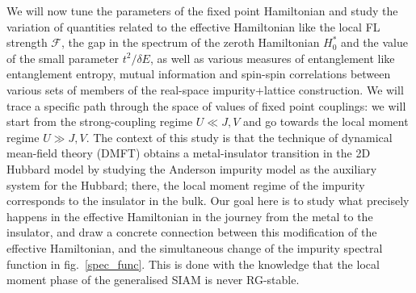 \documentclass{report}
\numberwithin{equation}{section}
\begin{document}
We will now tune the parameters of the fixed point Hamiltonian and study the variation of quantities related to the effective Hamiltonian like the local FL strength \(\mathcal{F}\), the gap in the spectrum of the zeroth Hamiltonian \(H_0^*\) and the value of the small parameter \(t^2/\delta E\), as well as various measures of entanglement like entanglement entropy, mutual information and spin-spin correlations between various sets of members of the real-space impurity+lattice construction. We will trace a specific path through the space of values of fixed point couplings: we will start from the strong-coupling regime \(U \ll J,V\) and go towards the local moment regime \(U \gg J,V\). The context of this study is that the technique of dynamical mean-field theory (DMFT) obtains a metal-insulator transition in the 2D Hubbard model by studying the Anderson impurity model as the auxiliary system for the Hubbard; there, the local moment regime of the impurity corresponds to the insulator in the bulk. Our goal here is to study what precisely happens in the effective Hamiltonian in the journey from the metal to the insulator, and draw a concrete connection between this modification of the effective Hamiltonian, and the simultaneous change of the impurity spectral function in fig.~\ref{spec_func}. This is done with the knowledge that the local moment phase of the generalised SIAM is never RG-stable.
\end{document}
